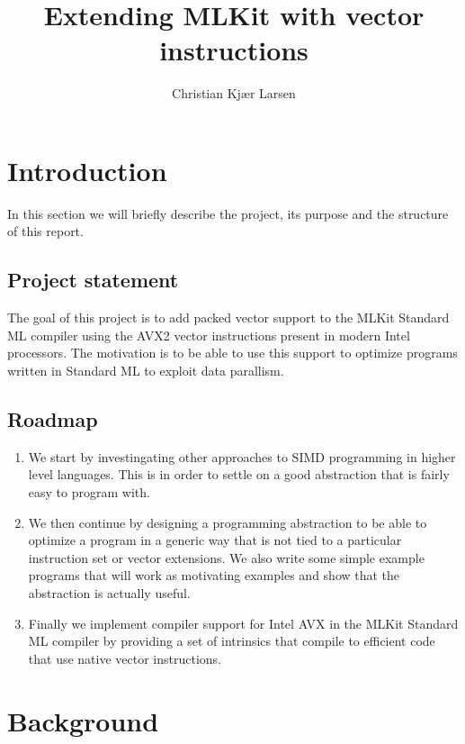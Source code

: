 \documentclass{article}
\title{Extending MLKit with vector instructions}
\author{Christian Kjær Larsen}
\begin{document}
\maketitle

\tableofcontents

\section{Introduction}

In this section we will briefly describe the project, its purpose and the structure of this report.

\subsection{Project statement}

The goal of this project is to add packed vector support to the MLKit\cite{mlkit} Standard ML compiler using the AVX2 vector instructions present in modern Intel processors. The motivation is to be able to use this support to optimize programs written in Standard ML to exploit data parallism.

\subsection{Roadmap}

\begin{enumerate}
    \item We start by investingating other approaches to SIMD programming in higher level languages. This is in order to settle on a
        good abstraction that is fairly easy to program with.
    \item
        We then continue by designing a programming abstraction to be able to optimize a program in a generic way that is not tied to a particular instruction set or vector extensions.
        We also write some simple example programs that will work as motivating examples and show that the abstraction is actually useful.
    \item
        Finally we implement compiler support for Intel AVX in the MLKit Standard ML compiler by providing a set of intrinsics that compile to efficient code that use native vector instructions.
\end{enumerate}

\section{Background}
\end{document}
